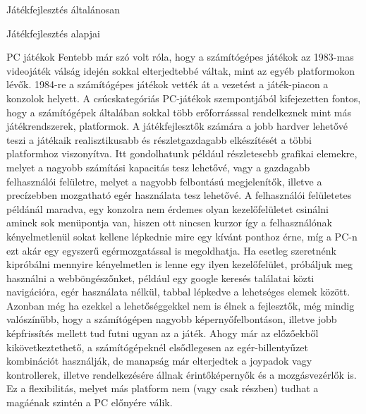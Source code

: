 \begin{MyChapter}{Játékfejlesztés általánosan}
\begin{MySection}{Játékfejlesztés alapjai}
		\begin{MySubSection}{PC játékok}
			Fentebb már szó volt róla, hogy a számítógépes játékok az 1983-mas videojáték válság idején sokkal elterjedtebbé váltak, mint az egyéb platformokon lévők. 1984-re a számítógépes játékok vették át a vezetést a játék-piacon a konzolok helyett.
			A csúcskategóriás PC-játékok szempontjából kifejezetten fontos, hogy a számítógépek általában sokkal több erőforrásssal rendelkeznek mint más játékrendszerek, platformok. A játékfejlesztők számára a jobb hardver lehetővé teszi a játékaik realisztikusabb és részletgazdagabb elkészítését a többi platformhoz viszonyítva. Itt gondolhatunk például részletesebb grafikai elemekre, melyet a nagyobb számítási kapacitás tesz lehetővé, vagy a gazdagabb felhasználói felületre, melyet a nagyobb felbontású megjelenítők, illetve a precízebben mozgatható egér használata tesz lehetővé. A felhasználói felületetes példánál maradva, egy konzolra nem érdemes olyan kezelőfelületet csinálni aminek sok menüpontja van, hiszen ott nincsen kurzor így a felhasználónak kényelmetlenül sokat kellene lépkednie mire egy kívánt ponthoz érne, míg a PC-n ezt akár egy egyszerű egérmozgatással is megoldhatja.
			Ha esetleg szeretnénk kipróbálni mennyire kényelmetlen is lenne egy ilyen kezelőfelület, próbáljuk meg használni a webböngészőnket, például egy google keresés találatai közti navigációra, egér használata nélkül, tabbal lépkedve a lehetséges elemek között.
			Azonban még ha ezekkel a lehetőséggekkel nem is élnek a fejlesztők, még mindig valószínűbb, hogy a számítógépen nagyobb képernyőfelbontáson, illetve jobb képfrissítés mellett tud futni ugyan az a játék.
			Ahogy már az előzőekből kikövetkeztethető, a számítógépeknél elsődlegesen az egér-billentyűzet kombinációt használják, de manapság már elterjedtek a joypadok vagy kontrollerek, illetve rendelkezésére állnak érintőképernyők és a mozgásvezérlők is. Ez a flexibilitás, melyet más platform nem (vagy csak részben) tudhat a magáénak szintén a PC előnyére válik. 
		\end{MySubSection}
		
		

\end{MySection}
\end{MyChapter}
